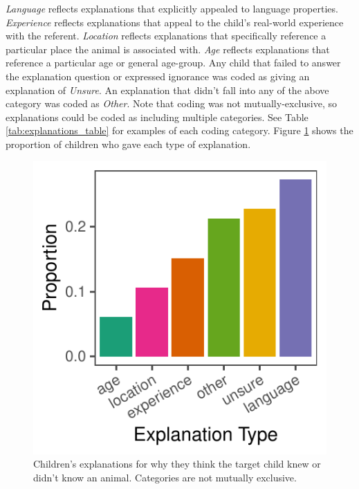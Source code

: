 \documentclass[10pt, letterpaper]{article}
\newenvironment{CodeChunk}{}{}
\begin{document}
\emph{Language} reflects explanations that explicitly appealed to
language properties. \emph{Experience} reflects explanations that appeal
to the child's real-world experience with the referent. \emph{Location}
reflects explanations that specifically reference a particular place the
animal is associated with. \emph{Age} reflects explanations that
reference a particular age or general age-group. Any child that failed
to answer the explanation question or expressed ignorance was coded as
giving an explanation of \emph{Unsure}. An explanation that didn't fall
into any of the above category was coded as \emph{Other}. Note that
coding was not mutually-exclusive, so explanations could be coded as
including multiple categories. See Table \ref{tab:explanations_table}
for examples of each coding category. Figure \ref{fig:explanations}
shows the proportion of children who gave each type of explanation.

\begin{CodeChunk}
\begin{figure}[tb]
\includegraphics{figs/explanations-1} \caption[Children's explanations for why they think the target child knew or didn't know an animal]{Children's explanations for why they think the target child knew or didn't know an animal. Categories are not mutually exclusive.}\label{fig:explanations}
\end{figure}
\end{CodeChunk}
\end{document}
